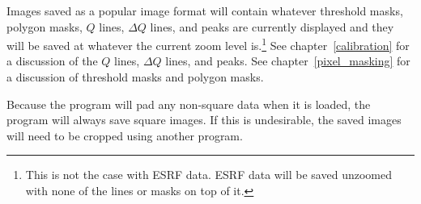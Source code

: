Images saved as a popular image format will contain whatever
threshold masks, polygon masks, $Q$ lines, $\Delta Q$ lines, and peaks 
are currently displayed and they will be saved
at whatever the current zoom level is.\footnote{This is not the case with 
ESRF data. ESRF data will be saved unzoomed with none
of the lines or masks on top of it.} See chapter~\ref{calibration} for 
a discussion of the $Q$ lines, $\Delta Q$ lines, and peaks. See 
chapter~\ref{pixel_masking} for a discussion of threshold masks and 
polygon masks.

Because the program will pad any non-square data when
it is loaded, the program will always save square
images. If this is undesirable, the saved images
will need to be cropped using another program.


